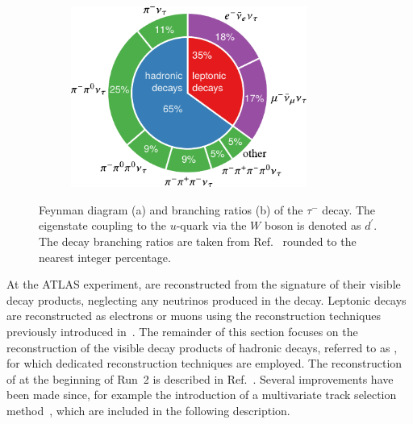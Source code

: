 \begin{figure}[htb]
\begin{subfigure}[b]{0.47\textwidth}
    \includegraphics[width=0.85\textwidth]{figs/tauid/tau_branching_pie_chart_new}

    \subcaption{}%
    \label{fig:tau_branching_ratios}
  \end{subfigure}

  \caption{Feynman diagram (a) and branching ratios (b) of the $\tau^{-}$ decay.
    The eigenstate coupling to the $u$-quark via the $W$ boson is denoted as
    $d^\prime$.  The \taulepton decay branching ratios are taken from
    Ref.~\cite{pdg2020} rounded to the nearest integer percentage.}%
  \label{fig:tau_feynman_br}
\end{figure}

At the ATLAS experiment, \tauleptons are reconstructed from the signature of
their visible decay products, neglecting any neutrinos produced in the
decay. Leptonic \taulepton decays are reconstructed as electrons or muons using
the reconstruction techniques previously introduced
in~. The remainder of this section focuses on the
reconstruction of the visible decay products of hadronic \taulepton decays,
referred to as \tauhadvis, for which dedicated reconstruction techniques are
employed. The reconstruction of \tauhadvis at the beginning of Run~2 is
described in Ref.~\cite{ATLAS-CONF-2017-029}. Several improvements have been
made since, for example the introduction of a multivariate track selection
method~\cite{duschinger}, which are included in the following description.

